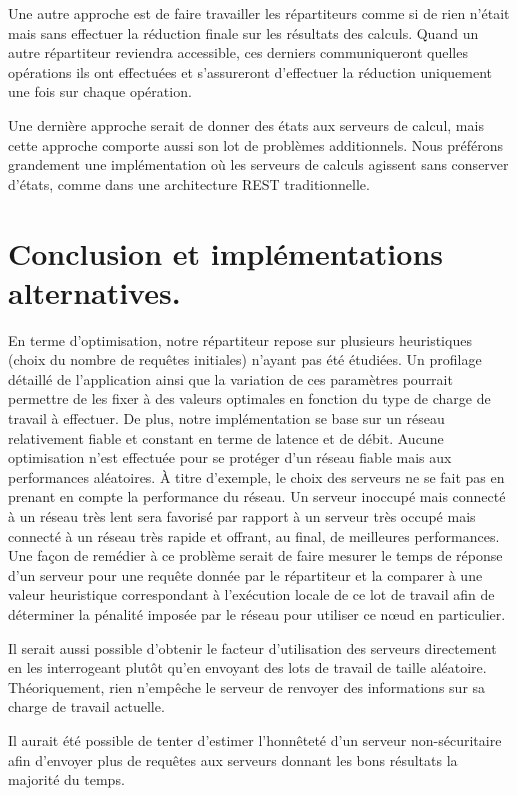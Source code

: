 Une autre approche est de faire travailler les répartiteurs comme si de rien n'était mais sans effectuer la réduction finale sur les résultats des calculs. Quand un autre répartiteur reviendra accessible, 
ces derniers communiqueront quelles opérations ils ont effectuées et s'assureront d'effectuer la réduction uniquement une fois sur chaque opération. 

Une dernière approche serait de donner des états aux serveurs de calcul, mais cette approche comporte aussi son lot de problèmes additionnels. 
Nous préférons grandement une implémentation où les serveurs de calculs agissent sans conserver d'états, comme dans une architecture REST traditionnelle. 

\section{Conclusion et implémentations alternatives.}

En terme d'optimisation, notre répartiteur repose sur plusieurs heuristiques (choix du nombre de requêtes initiales) n'ayant pas été étudiées. 
Un profilage détaillé de l'application ainsi que la variation de ces paramètres pourrait permettre de les fixer à des valeurs optimales en fonction
du type de charge de travail à effectuer. De plus, notre implémentation se base sur un réseau relativement fiable et constant en terme de latence et de débit. 
Aucune optimisation n'est effectuée pour se protéger d'un réseau fiable mais aux performances aléatoires. À titre d'exemple, le choix des serveurs ne se fait pas 
en prenant en compte la performance du réseau. Un serveur inoccupé mais connecté à un réseau très lent sera favorisé par rapport à un serveur très occupé mais connecté
à un réseau très rapide et offrant, au final, de meilleures performances. Une façon de remédier à ce problème serait de faire mesurer le temps de réponse d'un serveur
pour une requête donnée par le répartiteur et la comparer à une valeur heuristique correspondant à l'exécution locale de ce lot de travail afin de déterminer la
pénalité imposée par le réseau pour utiliser ce nœud en particulier. 

Il serait aussi possible d'obtenir le facteur d'utilisation des serveurs directement en les interrogeant plutôt qu'en envoyant des lots de travail de taille 
aléatoire. Théoriquement, rien n'empêche le serveur de renvoyer des informations sur sa charge de travail actuelle.

Il aurait été possible de tenter d'estimer l'honnêteté d'un serveur non-sécuritaire afin d'envoyer plus de requêtes aux serveurs donnant les bons résultats la majorité du temps. 

